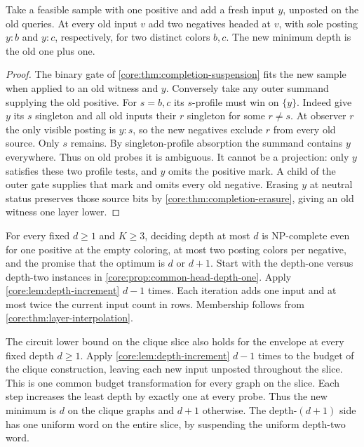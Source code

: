 \begin{lemma}\label{core:lem:depth-increment}
Take a feasible sample with one positive and add a fresh input $y$,
unposted on the old queries. At every old input $v$ add two negatives
headed at $v$, with sole posting $y:b$ and $y:c$, respectively, for
two distinct colors $b,c$. The new minimum depth is the old one plus one.
\end{lemma}
\begin{proof}
The binary gate of \cref{core:thm:completion-suspension} fits the new
sample when applied to an old witness and $y$. Conversely take any
outer summand supplying the old positive. For $s=b,c$ its $s$-profile
must win on $\{y\}$. Indeed give $y$ its $s$ singleton and all old
inputs their $r$ singleton for some $r\ne s$. At observer $r$ the only
visible posting is $y:s$, so the new negatives exclude $r$ from
every old source. Only $s$ remains. By singleton-profile absorption
the summand contains $y$ everywhere. Thus on old probes it is
ambiguous. It cannot be a projection: only $y$ satisfies these two
profile tests, and $y$ omits the positive mark. A child of the outer
gate supplies that mark and omits every old negative. Erasing $y$ at
neutral status preserves those source bits by
\cref{core:thm:completion-erasure}, giving an old witness one layer lower.
\end{proof}

For every fixed $d\ge1$ and $K\ge3$, deciding depth at most $d$ is
NP-complete even for one positive at the empty coloring, at most two
posting colors per negative, and the promise that the optimum is $d$
or $d+1$. Start with the depth-one versus depth-two instances in
\cref{core:prop:common-head-depth-one}. Apply
\cref{core:lem:depth-increment} $d-1$ times. Each iteration adds one input and at most
twice the current input count in rows. Membership follows from
\cref{core:thm:layer-interpolation}.

The circuit lower bound on the clique slice also
holds for the envelope at every fixed depth $d\ge1$.
Apply \cref{core:lem:depth-increment} $d-1$ times to
the budget of the clique construction, leaving each
new input unposted throughout the slice. This is
one common budget transformation for every graph
on the slice. Each step increases the least depth
by exactly one at every probe. Thus the new
minimum is $d$ on the clique graphs and $d+1$
otherwise. The depth-$(d+1)$ side has one uniform
word on the entire slice, by suspending the
uniform depth-two word.

